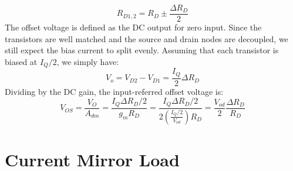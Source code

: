     \begin{equation} 
        {R_{D1,2}} = {R_D} \pm \frac{ \Delta {R_D}}{2} 
    \end{equation}
The offset voltage is defined as the DC output for zero input.  Since the transistors are well matched and the source and drain nodes are decoupled, we still expect the bias current to split evenly.  Assuming that each transistor is biased at $I_Q/2$, we simply have:
    \begin{equation}
        {V_o} = {V_{D2}} - {V_{D1}} = \frac{I_Q}{2}\Delta {R_D}
    \end{equation}
Dividing by the DC gain, the input-referred offset voltage is:
    \begin{equation}
        {V_{OS}} = \frac{{{V_O}}}{{{A_{dm}}}} = \frac{{I_Q\Delta {R_D}/2}}{{{g_m}{R_D}}} = \frac{{I_Q\Delta {R_D}/2}}{{2\left( {\frac{{I_Q/2}}{{{V_{od}}}}} \right){R_D}}} = \frac{{{V_{od}}}}{2}\frac{{\Delta {R_D}}}{{{R_D}}}
    \end{equation}
\section{Current Mirror Load}

